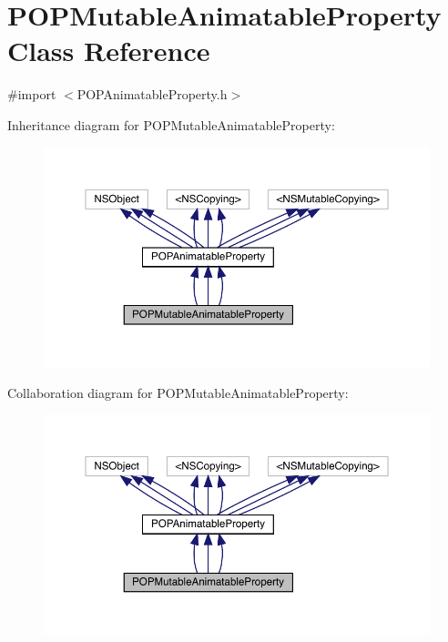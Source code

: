 \hypertarget{interface_p_o_p_mutable_animatable_property}{}\section{P\+O\+P\+Mutable\+Animatable\+Property Class Reference}
\label{interface_p_o_p_mutable_animatable_property}


{\ttfamily \#import $<$P\+O\+P\+Animatable\+Property.\+h$>$}



Inheritance diagram for P\+O\+P\+Mutable\+Animatable\+Property\+:\nopagebreak
\begin{figure}[H]
\begin{center}
\leavevmode
\includegraphics[width=350pt]{interface_p_o_p_mutable_animatable_property__inherit__graph}
\end{center}
\end{figure}


Collaboration diagram for P\+O\+P\+Mutable\+Animatable\+Property\+:\nopagebreak
\begin{figure}[H]
\begin{center}
\leavevmode
\includegraphics[width=350pt]{interface_p_o_p_mutable_animatable_property__coll__graph}
\end{center}
\end{figure}
